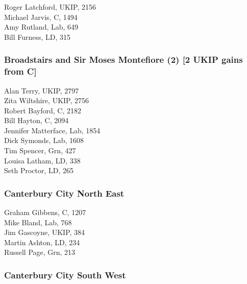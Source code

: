 \documentclass[a4paper,openany,10pt]{book}
\begin{document}


Roger Latchford, UKIP, 2156\\
Michael Jarvis, C, 1494\\
Amy Rutland, Lab, 649\\
Bill Furness, LD, 315\\


\subsubsection*{Broadstairs and Sir Moses Montefiore (2) \hspace*{\fill}\nolinebreak[1]%
\enspace\hspace*{\fill}
[2 UKIP gains from C]}



Alan Terry, UKIP, 2797\\
Zita Wiltshire, UKIP, 2756\\
Robert Bayford, C, 2182\\
Bill Hayton, C, 2094\\
Jennifer Matterface, Lab, 1854\\
Dick Symonds, Lab, 1608\\
Tim Spencer, Grn, 427\\
Louisa Latham, LD, 338\\
Seth Proctor, LD, 265\\


\subsubsection*{Canterbury City North East}



Graham Gibbens, C, 1207\\
Mike Bland, Lab, 768\\
Jim Gascoyne, UKIP, 384\\
Martin Ashton, LD, 234\\
Russell Page, Grn, 213\\


\subsubsection*{Canterbury City South West}
\end{document}
